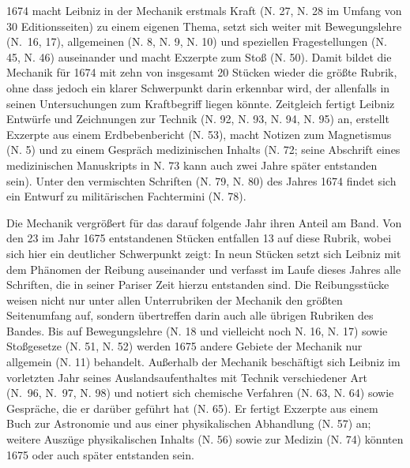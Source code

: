 1674 macht Leibniz in der Mechanik erstmals Kraft (N. 27, N. 28 im Umfang von 30 Editionsseiten) zu einem eigenen Thema, setzt sich weiter mit Bewegungslehre (N.~16, 17), allgemeinen (N. 8, N. 9, N. 10) und speziellen Fragestellungen (N. 45, N. 46) auseinander und macht Exzerpte zum Stoß (N. 50). Damit bildet die Mechanik für 1674 mit zehn von insgesamt 20 Stücken wieder die größte Rubrik, ohne dass jedoch ein klarer Schwerpunkt darin erkennbar wird, der allenfalls in seinen Untersuchungen zum Kraftbegriff liegen könnte. Zeitgleich fertigt Leibniz Entwürfe und Zeichnungen zur Technik (N. 92, N. 93, N. 94, N. 95) an, erstellt Exzerpte aus einem Erdbebenbericht (N. 53), macht Notizen zum Magnetismus (N. 5) und zu einem Gespräch medizinischen Inhalts (N. 72; seine Abschrift eines medizinischen Manuskripts in N. 73 kann auch zwei Jahre später entstanden sein). Unter den vermischten Schriften (N. 79, N. 80) des Jahres 1674 findet sich ein Entwurf zu militärischen Fachtermini (N. 78).\par
Die Mechanik vergrößert für das darauf folgende Jahr ihren Anteil am Band. Von den 23 im Jahr 1675 entstandenen Stücken entfallen 13 auf diese Rubrik, wobei sich hier ein deutlicher Schwerpunkt zeigt: In neun Stücken setzt sich Leibniz mit dem Phänomen der Reibung auseinander und verfasst im Laufe dieses Jahres alle Schriften, die in seiner Pariser Zeit hierzu entstanden sind. Die Reibungsstücke weisen nicht nur unter allen Unterrubriken der Mechanik den größten Seitenumfang auf, sondern übertreffen darin auch alle übrigen Rubriken des Bandes. Bis auf Bewegungslehre (N. 18 und vielleicht noch N. 16, N. 17) sowie Stoßgesetze (N. 51, N. 52) werden 1675 andere Gebiete der Mechanik nur allgemein (N. 11) behandelt. Außerhalb der Mechanik beschäftigt sich Leibniz im vorletzten Jahr seines Auslandsaufenthaltes mit Technik verschiedener Art (N.~96, N.~97, N. 98) und notiert sich chemische Verfahren (N. 63, N. 64) sowie Gespräche, die er darüber geführt hat (N. 65). Er fertigt Exzerpte aus einem Buch zur Astronomie und aus einer physikalischen Abhandlung (N. 57) an; weitere Auszüge physikalischen Inhalts (N. 56) sowie zur Medizin (N. 74) könnten 1675 oder auch später entstanden sein.\par\newpage
